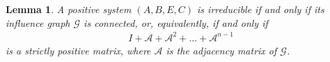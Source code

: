 \documentclass[letterpaper, 10 pt, conference]{ieeeconf}  %
\newtheorem{lemma}{Lemma}
\def\cA{\mathcal{A}}
\def\cG{\mathcal{G}}
\newcommand{\ie}{\textit{i}.\textit{e}., }
\begin{document}
\begin{lemma} \label{lem:3}
A positive system $(A,B,E,C)$ is irreducible if and only if its influence graph $\cG$ is connected, or, equivalently, if and only if 
\begin{align}
I + \cA +\cA^2 + \ldots + \cA^{n-1} \nonumber
\end{align}
is a strictly positive matrix, where $\cA$ is the adjacency matrix of $\cG$.
\end{lemma}
\end{document}
